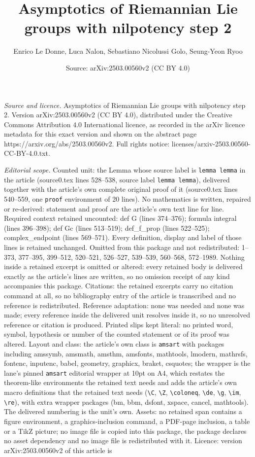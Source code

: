 \documentclass[10pt,a4paper]{amsart}
\title[Asymptotics of Riemannian Lie groups with nilpotency step 2]{Asymptotics of Riemannian Lie groups with nilpotency step 2}
\author{Enrico Le Donne, Luca Nalon, Sebastiano Nicolussi Golo, Seung-Yeon Ryoo}
\date{Source: arXiv:2503.00560v2 (CC BY 4.0)}
\begin{document}
\maketitle

\noindent\emph{Source and licence.} Asymptotics of Riemannian Lie groups with nilpotency step 2. Version arXiv:2503.00560v2 (CC BY 4.0), distributed under the Creative Commons Attribution 4.0 International licence, as recorded in the arXiv licence metadata for this exact version and shown on the abstract page https://arxiv.org/abs/2503.00560v2. Full rights notice: licenses/arxiv-2503.00560-CC-BY-4.0.txt.\par\smallskip

\noindent\textit{Editorial scope.} Counted unit: the Lemma whose source label is \texttt{lemma lemma} in the article (source0.tex lines 528--538, source label \texttt{lemma lemma}), delivered together with the article's own complete original proof of it (source0.tex lines 540--559, one \texttt{proof} environment of 20 lines). No mathematics is written, repaired or re-derived: statement and proof are the article's own text line for line. Required context retained uncounted: def G (lines 374--376); formula integral (lines 396--398); def Gc (lines 513--519); def\_f\_prop (lines 522--525); complex\_endpoint (lines 569--571). Every definition, display and label of those lines is retained unchanged. Omitted from this package and not redistributed: 1--373, 377--395, 399--512, 520--521, 526--527, 539--539, 560--568, 572--1989. Nothing inside a retained excerpt is omitted or altered: every retained body is delivered exactly as the article's lines are written, so no omission receipt of any kind accompanies this package. Citations: the retained excerpts carry no citation command at all, so no bibliography entry of the article is transcribed and no reference is redistributed. Reference adaptation: none was needed and none was made; every reference inside the delivered unit resolves inside it, so no unresolved reference or citation is produced. Printed slips kept literal: no printed word, symbol, hypothesis or number of the counted statement or of its proof was altered. Layout and class: the article's own class is \texttt{amsart} with packages including amssymb, amsmath, amsthm, amsfonts, mathtools, lmodern, mathrsfs, fontenc, inputenc, babel, geometry, graphicx, braket, csquotes; the wrapper is the lane's pinned \texttt{amsart} editorial wrapper at 10pt on A4, which restates the theorem-like environments the retained text needs and adds the article's own macro definitions that the retained text needs (\texttt{\textbackslash C}, \texttt{\textbackslash Z}, \texttt{\textbackslash coloneq}, \texttt{\textbackslash de}, \texttt{\textbackslash g}, \texttt{\textbackslash im}, \texttt{\textbackslash re}), with extra wrapper packages (bm, bbm, dsfont, xspace, cancel, mathtools). The delivered numbering is the unit's own. Assets: no retained span contains a figure environment, a graphics-inclusion command, a PDF-page inclusion, a table or a TikZ picture; no image file is copied into this package, the package declares no asset dependency and no image file is redistributed with it. Licence: version arXiv:2503.00560v2 of this article is 
\end{document}

